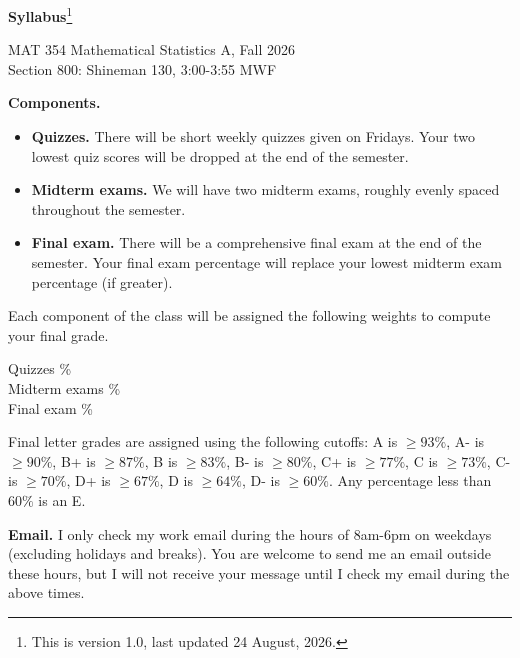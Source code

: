 \documentclass[11pt]{amsart}
\begin{document}
\begin{center}
{\huge \textbf{Syllabus}\footnote{This is version 1.0, last updated 24 August, 2026.}}

{\Large MAT 354 Mathematical Statistics A, Fall 2026 \\
\large Section 800: Shineman 130, 3:00-3:55 MWF
}
\end{center}


\textbf{Components.} 

\smallskip
\begin{itemize}
\item \textbf{Quizzes.} There will be short weekly quizzes given on Fridays. Your two lowest quiz scores will be dropped at the end of the semester. \smallskip
\item \textbf{Midterm exams.} We will have two midterm exams, roughly evenly spaced throughout the semester. \smallskip
\item \textbf{Final exam.} There will be a comprehensive final exam at the end of the semester. Your final exam percentage will replace your lowest midterm exam percentage (if greater).
\end{itemize}
\smallskip

Each component of the class will be assigned the following weights to compute your final grade.

\smallskip
\begin{center}
\begin{minipage}{0.85\linewidth}
Quizzes \% \\
Midterm exams \% \\
Final exam \%
\end{minipage}
\end{center}

\smallskip
Final letter grades are assigned using the following cutoffs: A is $\geq 93\%$, A- is $\geq 90\%$, B+ is $\geq 87\%$, B is $\geq 83\%$, B- is $\geq 80\%$, C+ is $\geq 77\%$, C is $\geq 73\%$, C- is $\geq 70\%$, D+ is $\geq 67\%$, D is $\geq 64\%$, D- is $\geq 60\%$. Any percentage less than $60\%$ is an E.

\smallskip
\textbf{Email.} I only check my work email during the hours of 8am-6pm on weekdays (excluding holidays and breaks). You are welcome to send me an email outside these hours, but I will not receive your message until I check my email during the above times.
\end{document}
